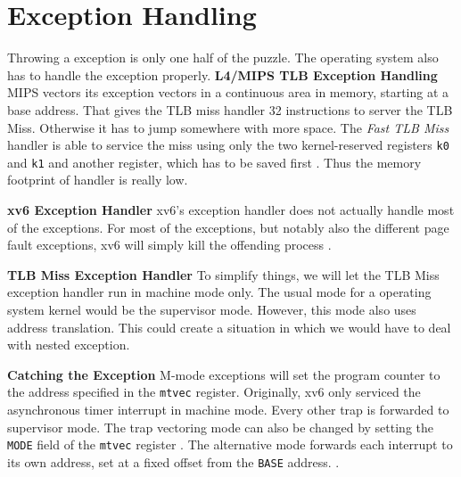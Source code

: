 
\section{Exception Handling}
Throwing a exception is only one half of the puzzle. The operating system also has to handle the exception
properly.
\textbf{L4/MIPS TLB Exception Handling}
MIPS vectors its exception vectors in a continuous area in memory, starting at a base address.
That gives the TLB miss handler 32 instructions to server the TLB Miss. Otherwise it has to jump
somewhere with more space.
The \emph{Fast TLB Miss} handler is able to service the miss using only the two kernel-reserved
registers \texttt{k0} and \texttt{k1} and another register, which has to be saved first \cite{heiserAnatomyHighPerformanceMicrokernel}.
Thus the memory footprint of handler is really low.

\textbf{xv6 Exception Handler}
xv6's exception handler does not actually handle most of the exceptions. For most of the exceptions,
but notably also the different page fault exceptions, xv6 will simply kill the offending process \cite{cox2011xv6}.

\textbf{TLB Miss Exception Handler}
To simplify things, we will let the TLB Miss exception handler run in machine mode only.
The usual mode for a operating system kernel would be the supervisor mode. However, this
mode also uses address translation. This could create a situation in which we would have
to deal with nested exception.

\textbf{Catching the Exception} M-mode exceptions will set the program counter to the address
specified in the \texttt{mtvec} register. Originally, xv6 only serviced the asynchronous
timer interrupt in machine mode. Every other trap is forwarded to supervisor mode.
The trap vectoring mode can also be changed by setting the \texttt{MODE} field of the
\texttt{mtvec} register \cite{RISCVInstructionSet}. The alternative mode forwards
each interrupt to its own address, set at a fixed offset from the \texttt{BASE} address.
.

